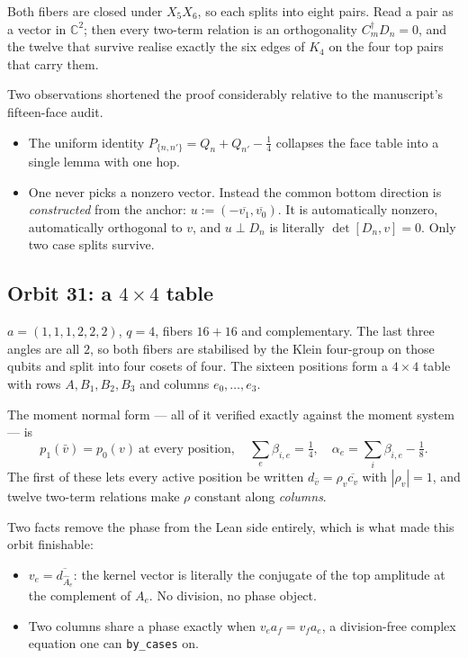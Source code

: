 \documentclass[11pt,a4paper]{article}
\newcommand{\CC}{\mathbb{C}}
\newcommand{\lean}[1]{\texttt{#1}}
\theoremstyle{definition}
\begin{document}
Both fibers are closed under $X_5 X_6$, so each splits into eight pairs. Read a
pair as a vector in $\CC^2$; then every two-term relation is an orthogonality
$C_m^\dagger D_n = 0$, and the twelve that survive realise exactly the six edges
of $K_4$ on the four top pairs that carry them.

Two observations shortened the proof considerably relative to the manuscript's
fifteen-face audit.
\begin{itemize}
\item The uniform identity
  $P_{\{n,n'\}} = Q_n + Q_{n'} - \tfrac14$
  collapses the face table into a single lemma with one hop.
\item One never picks a nonzero vector. Instead the common bottom direction is
  \emph{constructed} from the anchor:
  $u := (-\overline{v_1}, \overline{v_0})$.
  It is automatically nonzero, automatically orthogonal to $v$, and
  $u \perp D_n$ is literally $\det[D_n, v] = 0$. Only two case splits survive.
\end{itemize}

\subsection{Orbit 31: a \texorpdfstring{$4 \times 4$}{4 by 4} table}

$a = (1,1,1,2,2,2)$, $q = 4$, fibers $16 + 16$ and complementary. The last three
angles are all $2$, so both fibers are stabilised by the Klein four-group on those
qubits and split into four cosets of four. The sixteen positions form a
$4 \times 4$ table with rows $A, B_1, B_2, B_3$ and columns $e_0, \dots, e_3$.

The moment normal form --- all of it verified exactly against the moment system
--- is
\[
  p_1(\bar v) = p_0(v) \ \text{at every position},
  \quad
  \sum_e \beta_{i,e} = \tfrac14,
  \quad
  \alpha_e = \sum_i \beta_{i,e} - \tfrac18 .
\]
The first of these lets every active position be written
$d_{\bar v} = \rho_v \overline{c_v}$ with $|\rho_v| = 1$, and twelve two-term
relations make $\rho$ constant along \emph{columns}.

Two facts remove the phase from the Lean side entirely, which is what made this
orbit finishable:
\begin{itemize}
\item $v_e = \overline{d_{\hat A_e}}$: the kernel vector is literally the
  conjugate of the top amplitude at the complement of $A_e$. No division, no
  phase object.
\item Two columns share a phase exactly when $v_e a_f = v_f a_e$, a
  division-free complex equation one can \lean{by\_cases} on.
\end{itemize}
\end{document}
